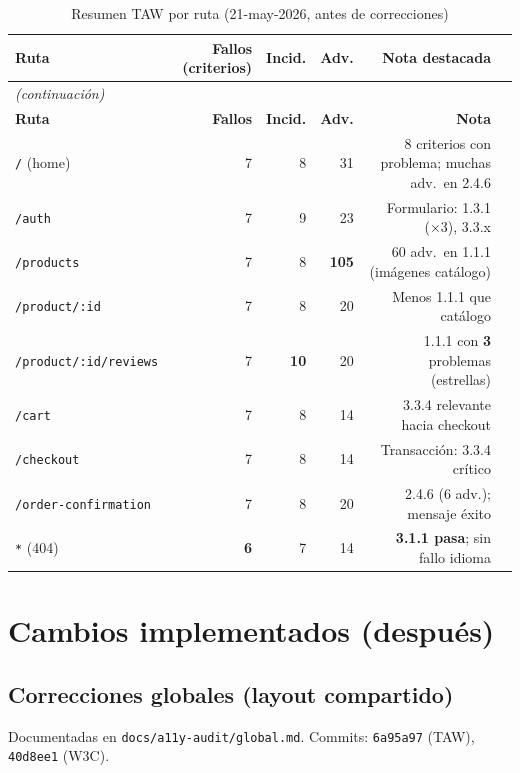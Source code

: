 \documentclass[11pt,a4paper]{article}
\begin{document}
{\small
\begin{longtable}{@{}lrrrrp{4.2cm}@{}}
\caption{Resumen TAW por ruta (21-may-2026, antes de correcciones)} \\
\toprule
\textbf{Ruta} & \textbf{Fallos (criterios)} & \textbf{Incid.} & \textbf{Adv.} & \textbf{Nota destacada} \\
\midrule
\endfirsthead
\multicolumn{5}{l}{\textit{(continuación)}} \\
\toprule
\textbf{Ruta} & \textbf{Fallos} & \textbf{Incid.} & \textbf{Adv.} & \textbf{Nota} \\
\midrule
\endhead
\bottomrule
\endfoot
\texttt{/} (home) & 7 & 8 & 31 & 8 criterios con problema; muchas adv.\ en 2.4.6 \\
\texttt{/auth} & 7 & 9 & 23 & Formulario: 1.3.1 (×3), 3.3.x \\
\texttt{/products} & 7 & 8 & \textbf{105} & 60 adv.\ en 1.1.1 (imágenes catálogo) \\
\texttt{/product/:id} & 7 & 8 & 20 & Menos 1.1.1 que catálogo \\
\texttt{/product/:id/reviews} & 7 & \textbf{10} & 20 & 1.1.1 con \textbf{3} problemas (estrellas) \\
\texttt{/cart} & 7 & 8 & 14 & 3.3.4 relevante hacia checkout \\
\texttt{/checkout} & 7 & 8 & 14 & Transacción: 3.3.4 crítico \\
\texttt{/order-confirmation} & 7 & 8 & 20 & 2.4.6 (6 adv.); mensaje éxito \\
\texttt{*} (404) & \textbf{6} & 7 & 14 & \textbf{3.1.1 pasa}; sin fallo idioma \\
\bottomrule
\end{longtable}
}

\section{Cambios implementados (después)}

\subsection{Correcciones globales (layout compartido)}

Documentadas en \texttt{docs/a11y-audit/global.md}. Commits: \texttt{6a95a97} (TAW), \texttt{40d8ee1} (W3C).
\end{document}
